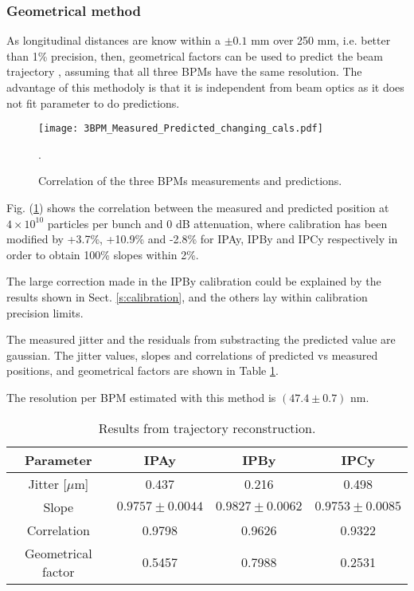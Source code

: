 \subsubsection{Geometrical method}
As longitudinal distances are know within a $\pm0.1$ mm over 250 mm, i.e. better than 1\% precision, then, geometrical factors can be used to predict the beam trajectory \cite{Nakamura:2008}, assuming that all three BPMs have the same resolution. The advantage of this methodoly is that it is independent from beam optics as it does not fit parameter to do predictions.\par
\begin{figure}[!htb]
\centering%
 \texttt{[image: 3BPM\_Measured\_Predicted\_changing\_cals.pdf]}\caption{Correlation of the three BPMs measurements and predictions.}\label{f:3BPMpredictions}.
\end{figure}
Fig. (\ref{f:3BPMpredictions}) shows the correlation between the measured and predicted position at $4\times10^{10}$ particles per bunch and 0 dB attenuation, where calibration has been modified by +3.7\%, +10.9\% and -2.8\% for IPAy, IPBy and IPCy respectively in order to obtain 100\% slopes within 2\%.\par
The large correction made in the IPBy calibration could be explained by the results shown in Sect. \ref{s:calibration}, and the others lay within calibration precision limits.\par
The measured jitter and the residuals from substracting the predicted value are gaussian. The jitter values, slopes and correlations of predicted vs measured positions, and geometrical factors are shown in Table \ref{t:resodata}.\par
The resolution per BPM estimated with this method is $(47.4\pm0.7)$ nm.\par
\begin{table}[hbt]
\centering
\begin{tabular}{c||c|c|c}\hline
Parameter & IPAy & IPBy & IPCy\\ \hline\hline
Jitter [$\mu$m] & 0.437 & 0.216 & 0.498\\\hline
Slope & $0.9757\pm0.0044$ & $0.9827\pm0.0062$ & $0.9753\pm0.0085$\\\hline
Correlation & 0.9798 & 0.9626 & 0.9322 \\\hline
Geometrical factor & 0.5457 & 0.7988 & 0.2531\\\hline
\end{tabular}\caption{Results from trajectory reconstruction.}\label{t:resodata}
\end{table}
